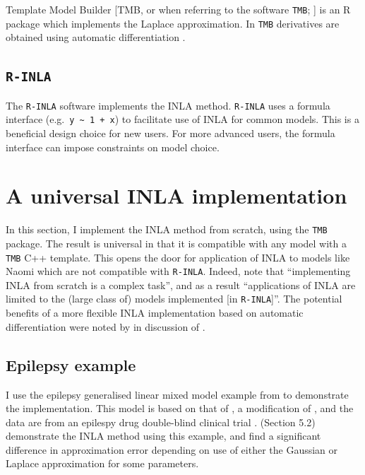 \documentclass[a4paper, nobind]{templates/ociamthesis}
\begin{document}
Template Model Builder {[}TMB, or when referring to the software \texttt{TMB}; \textcite{kristensen2016tmb}{]} is an R package which implements the Laplace approximation.
In \texttt{TMB} derivatives are obtained using automatic differentiation \autocite{baydin2017automatic}.

\hypertarget{r-inla}{%
\subsection{\texorpdfstring{\texttt{R-INLA}}{R-INLA}}\label{r-inla}}

The \texttt{R-INLA} software implements the INLA method.
\texttt{R-INLA} uses a formula interface (e.g.~\texttt{y\ \textasciitilde{}\ 1\ +\ x}) to facilitate use of INLA for common models.
This is a beneficial design choice for new users.
For more advanced users, the formula interface can impose constraints on model choice.

\hypertarget{a-universal-inla-implementation}{%
\section{A universal INLA implementation}\label{a-universal-inla-implementation}}

In this section, I implement the INLA method from scratch, using the \texttt{TMB} package.
The result is universal in that it is compatible with any model with a \texttt{TMB} C++ template.
This opens the door for application of INLA to models like Naomi which are not compatible with \texttt{R-INLA}.
Indeed, \textcite{martino2019integrated} note that ``implementing INLA from scratch is a complex task'', and as a result ``applications of INLA are limited to the (large class of) models implemented {[}in \texttt{R-INLA}{]}''.
The potential benefits of a more flexible INLA implementation based on automatic differentiation were noted by \textcite{skaug2009approximate} in discussion of \textcite{rue2009approximate}.

\hypertarget{epilepsy-example}{%
\subsection{Epilepsy example}\label{epilepsy-example}}

I use the epilepsy generalised linear mixed model example from \textcite{spiegelhalter1996bugs} to demonstrate the implementation.
This model is based on that of \textcite{breslow1993approximate}, a modification of \textcite{thall1990some}, and the data are from an epilespy drug double-blind clinical trial \autocite{leppik1985double}.
\textcite{rue2009approximate} (Section 5.2) demonstrate the INLA method using this example, and find a significant difference in approximation error depending on use of either the Gaussian or Laplace approximation for some parameters.
\end{document}
